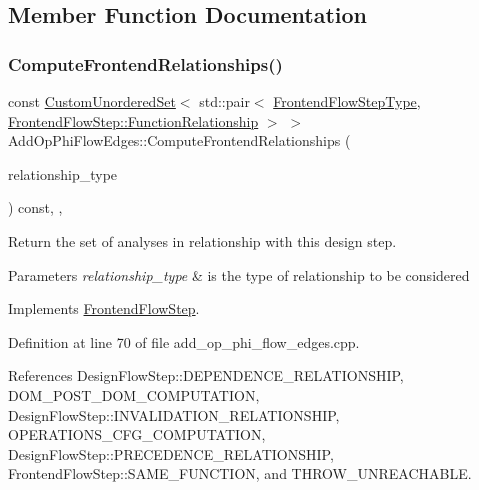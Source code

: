 \subsection{Member Function Documentation}
\mbox{\label{classAddOpPhiFlowEdges_a70d4933aac7528718424678981aac9ea}} 
\subsubsection{\texorpdfstring{Compute\+Frontend\+Relationships()}{ComputeFrontendRelationships()}}
{\footnotesize\ttfamily const \hyperlink{classCustomUnorderedSet}{Custom\+Unordered\+Set}$<$ std\+::pair$<$ \hyperlink{frontend__flow__step_8hpp_afeb3716c693d2b2e4ed3e6d04c3b63bb}{Frontend\+Flow\+Step\+Type}, \hyperlink{classFrontendFlowStep_af7cf30f2023e5b99e637dc2058289ab0}{Frontend\+Flow\+Step\+::\+Function\+Relationship} $>$ $>$ Add\+Op\+Phi\+Flow\+Edges\+::\+Compute\+Frontend\+Relationships (\begin{DoxyParamCaption}\item[{const \hyperlink{classDesignFlowStep_a723a3baf19ff2ceb77bc13e099d0b1b7}{Design\+Flow\+Step\+::\+Relationship\+Type}}]{relationship\+\_\+type }\end{DoxyParamCaption}) const\hspace{0.3cm}{\ttfamily [override]}, {\ttfamily [private]}, {\ttfamily [virtual]}}



Return the set of analyses in relationship with this design step. 


\begin{DoxyParams}{Parameters}
{\em relationship\+\_\+type} & is the type of relationship to be considered \\
\hline
\end{DoxyParams}


Implements \hyperlink{classFrontendFlowStep_abeaff70b59734e462d347ed343dd700d}{Frontend\+Flow\+Step}.



Definition at line 70 of file add\+\_\+op\+\_\+phi\+\_\+flow\+\_\+edges.\+cpp.



References Design\+Flow\+Step\+::\+D\+E\+P\+E\+N\+D\+E\+N\+C\+E\+\_\+\+R\+E\+L\+A\+T\+I\+O\+N\+S\+H\+IP, D\+O\+M\+\_\+\+P\+O\+S\+T\+\_\+\+D\+O\+M\+\_\+\+C\+O\+M\+P\+U\+T\+A\+T\+I\+ON, Design\+Flow\+Step\+::\+I\+N\+V\+A\+L\+I\+D\+A\+T\+I\+O\+N\+\_\+\+R\+E\+L\+A\+T\+I\+O\+N\+S\+H\+IP, O\+P\+E\+R\+A\+T\+I\+O\+N\+S\+\_\+\+C\+F\+G\+\_\+\+C\+O\+M\+P\+U\+T\+A\+T\+I\+ON, Design\+Flow\+Step\+::\+P\+R\+E\+C\+E\+D\+E\+N\+C\+E\+\_\+\+R\+E\+L\+A\+T\+I\+O\+N\+S\+H\+IP, Frontend\+Flow\+Step\+::\+S\+A\+M\+E\+\_\+\+F\+U\+N\+C\+T\+I\+ON, and T\+H\+R\+O\+W\+\_\+\+U\+N\+R\+E\+A\+C\+H\+A\+B\+LE.


